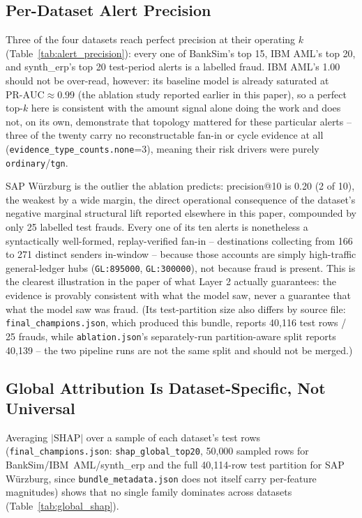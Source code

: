 \subsection{Per-Dataset Alert Precision}
Three of the four datasets reach perfect precision at their operating $k$
(Table~\ref{tab:alert_precision}): every one of BankSim's top 15, IBM AML's
top 20, and synth\_erp's top 20 test-period alerts is a labelled fraud. IBM
AML's 1.00 should not be over-read, however: its baseline model is already
saturated at $\mathrm{PR\text{-}AUC}\approx0.99$ (the ablation study reported earlier in this paper),
so a perfect top-$k$ here is consistent with the amount signal alone doing
the work and does not, on its own, demonstrate that topology mattered for
these particular alerts -- three of the twenty carry no reconstructable
fan-in or cycle evidence at all (\texttt{evidence\_type\_counts.none}=3),
meaning their risk drivers were purely \texttt{ordinary}/\texttt{tgn}.

SAP Würzburg is the outlier the ablation predicts: precision@10 is 0.20 (2 of
10), the weakest by a wide margin, the direct operational consequence of the
dataset's negative marginal structural lift reported elsewhere in this
paper, compounded by only 25 labelled test frauds. Every one of its ten
alerts is nonetheless a syntactically well-formed, replay-verified fan-in --
destinations collecting from 166 to 271 distinct senders in-window --
because those accounts are simply high-traffic general-ledger hubs
(\texttt{GL:895000}, \texttt{GL:300000}), not because fraud is present. This
is the clearest illustration in the paper of what Layer 2 actually
guarantees: the evidence is provably consistent with what the model saw,
never a guarantee that what the model saw was fraud. (Its test-partition
size also differs by source file: \texttt{final\_champions.json}, which
produced this bundle, reports 40{,}116 test rows / 25 frauds, while
\texttt{ablation.json}'s separately-run partition-aware split reports
40{,}139 -- the two pipeline runs are not the same split and should not be
merged.)

\subsection{Global Attribution Is Dataset-Specific, Not Universal}
Averaging $|\text{SHAP}|$ over a sample of each dataset's test rows
(\texttt{final\_champions.json}: \texttt{shap\_global\_top20}, 50{,}000
sampled rows for BankSim/IBM~AML/synth\_erp and the full 40{,}114-row test
partition for SAP Würzburg, since \texttt{bundle\_metadata.json} does not
itself carry per-feature magnitudes) shows that no single family dominates
across datasets (Table~\ref{tab:global_shap}).

